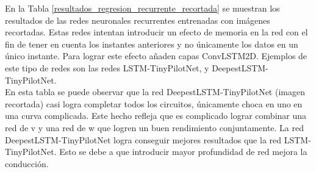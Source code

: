 En la Tabla \ref{resultados_regresion_recurrente_recortada} se muestran los resultados de las redes neuronales recurrentes entrenadas con imágenes recortadas. Estas redes intentan introducir un efecto de memoria en la red con el fin de tener en cuenta los instantes anteriores y no únicamente los datos en un único instante. Para lograr este efecto añaden capas ConvLSTM2D. Ejemplos de este tipo de redes son las redes LSTM-TinyPilotNet, y DeepestLSTM-TinyPilotNet.\\

En esta tabla se puede observar que la red DeepestLSTM-TinyPilotNet (imagen recortada) casi logra completar todos los circuitos, únicamente choca en uno en una curva complicada. Este hecho refleja que es complicado lograr combinar una red de v y una red de w que logren un buen rendimiento conjuntamente. La red DeepestLSTM-TinyPilotNet logra conseguir mejores resultados que la red LSTM-TinyPilotNet. Esto se debe a que introducir mayor profundidad de red mejora la conducción. \\


